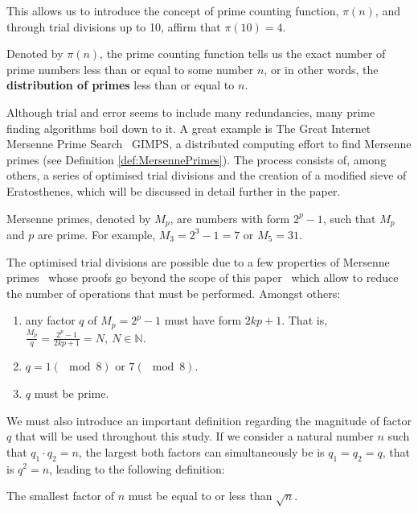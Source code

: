 This allows us to introduce the concept of prime counting function, $\pi(n)$, and through trial divisions up to 10, affirm that $\pi(10)=4$.

\begin{Def}\label{def:Pi(n)}
	Denoted by $\pi(n)$, the prime counting function tells us the exact number of prime numbers less than or equal to some number $n$, or in other words, the \textbf{distribution of primes} less than or equal to $n$.
\end{Def}

Although trial and error seems to include many redundancies, many prime finding algorithms boil down to it. A great example is The Great Internet Mersenne Prime Search \textendash\ GIMPS, a distributed computing effort to find Mersenne primes (see Definition \ref{def:MersennePrimes}). The process consists of, among others, a series of optimised trial divisions and the creation of a modified sieve of Eratosthenes, which will be discussed in detail further in the paper.

\begin{Def} \label{def:MersennePrimes}
	Mersenne primes, denoted by $M_p$, are numbers with form $2^p-1$, such that $M_p$ and $p$ are prime. For example, $M_3 = 2^3-1 = 7$ or $M_5 = 31$.
\end{Def}

The optimised trial divisions are possible due to a few properties of Mersenne primes \textendash\ whose proofs go beyond the scope of this paper \textendash\ which allow to reduce the number of operations that must be performed. Amongst others\citep{GimpsMath}:
\begin{Def}\label{def:PropertiesOfMersennePrimes}
\begin{enumerate}
	\item any factor $q$ of $M_p = 2^p-1$ must have form $2kp+1$. That is, $\frac{M_p}{q} = \frac{2^p-1}{2kp+1} = N, \ N \in \mathbb{N}$.
	\item $q = 1 (\mod 8) \text{ or } 7 (\mod 8)$.
	\item $q$ must be prime.
\end{enumerate}	
\end{Def}

We must also introduce an important definition regarding the magnitude of factor $q$ that will be used throughout this study. If we consider a natural number $n$ such that $q_1 \cdot q_2 = n$, the largest both factors can simultaneously be is $q_1 = q_2 = q$, that is $q^2 = n$, leading to the following definition:
\begin{Def}\label{def:SqrtN}
	The smallest factor of $n$ must be equal to or less than $\sqrt n$.
\end{Def}

